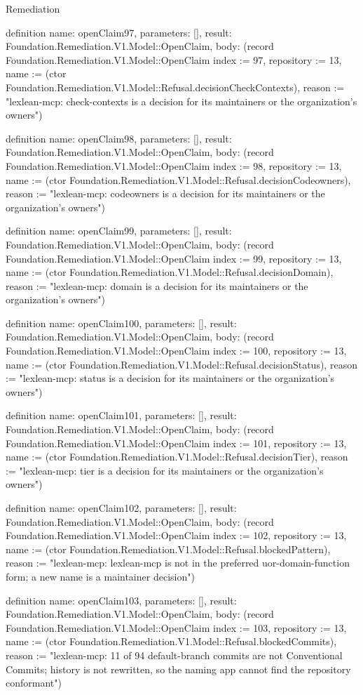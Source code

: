 \begin{lexlean}{Remediation}
\begin{semanticmodule}
definition{
  name: openClaim97,
  parameters: [],
  result: Foundation.Remediation.V1.Model::OpenClaim,
  body: (record Foundation.Remediation.V1.Model::OpenClaim {index := 97, repository := 13, name := (ctor Foundation.Remediation.V1.Model::Refusal.decisionCheckContexts), reason := "lexlean-mcp: check-contexts is a decision for its maintainers or the organization's owners"})
}

definition{
  name: openClaim98,
  parameters: [],
  result: Foundation.Remediation.V1.Model::OpenClaim,
  body: (record Foundation.Remediation.V1.Model::OpenClaim {index := 98, repository := 13, name := (ctor Foundation.Remediation.V1.Model::Refusal.decisionCodeowners), reason := "lexlean-mcp: codeowners is a decision for its maintainers or the organization's owners"})
}

definition{
  name: openClaim99,
  parameters: [],
  result: Foundation.Remediation.V1.Model::OpenClaim,
  body: (record Foundation.Remediation.V1.Model::OpenClaim {index := 99, repository := 13, name := (ctor Foundation.Remediation.V1.Model::Refusal.decisionDomain), reason := "lexlean-mcp: domain is a decision for its maintainers or the organization's owners"})
}

definition{
  name: openClaim100,
  parameters: [],
  result: Foundation.Remediation.V1.Model::OpenClaim,
  body: (record Foundation.Remediation.V1.Model::OpenClaim {index := 100, repository := 13, name := (ctor Foundation.Remediation.V1.Model::Refusal.decisionStatus), reason := "lexlean-mcp: status is a decision for its maintainers or the organization's owners"})
}

definition{
  name: openClaim101,
  parameters: [],
  result: Foundation.Remediation.V1.Model::OpenClaim,
  body: (record Foundation.Remediation.V1.Model::OpenClaim {index := 101, repository := 13, name := (ctor Foundation.Remediation.V1.Model::Refusal.decisionTier), reason := "lexlean-mcp: tier is a decision for its maintainers or the organization's owners"})
}

definition{
  name: openClaim102,
  parameters: [],
  result: Foundation.Remediation.V1.Model::OpenClaim,
  body: (record Foundation.Remediation.V1.Model::OpenClaim {index := 102, repository := 13, name := (ctor Foundation.Remediation.V1.Model::Refusal.blockedPattern), reason := "lexlean-mcp: lexlean-mcp is not in the preferred uor-{domain}-{function} form; a new name is a maintainer decision"})
}

definition{
  name: openClaim103,
  parameters: [],
  result: Foundation.Remediation.V1.Model::OpenClaim,
  body: (record Foundation.Remediation.V1.Model::OpenClaim {index := 103, repository := 13, name := (ctor Foundation.Remediation.V1.Model::Refusal.blockedCommits), reason := "lexlean-mcp: 11 of 94 default-branch commits are not Conventional Commits; history is not rewritten, so the naming app cannot find the repository conformant"})
}


\end{semanticmodule}
\end{lexlean}
